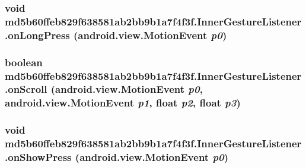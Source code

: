 \hypertarget{classmd5b60ffeb829f638581ab2bb9b1a7f4f3f_1_1_inner_gesture_listener_6ba34beec4f15b2b99e347516a70bf48}{
\subsubsection[{onLongPress}]{\setlength{\rightskip}{0pt plus 5cm}void md5b60ffeb829f638581ab2bb9b1a7f4f3f.InnerGestureListener.onLongPress (android.view.MotionEvent {\em p0})}}
\label{classmd5b60ffeb829f638581ab2bb9b1a7f4f3f_1_1_inner_gesture_listener_6ba34beec4f15b2b99e347516a70bf48}


\hypertarget{classmd5b60ffeb829f638581ab2bb9b1a7f4f3f_1_1_inner_gesture_listener_cc5b84dc58658cb693ceb013d18483d0}{
\subsubsection[{onScroll}]{\setlength{\rightskip}{0pt plus 5cm}boolean md5b60ffeb829f638581ab2bb9b1a7f4f3f.InnerGestureListener.onScroll (android.view.MotionEvent {\em p0}, \/  android.view.MotionEvent {\em p1}, \/  float {\em p2}, \/  float {\em p3})}}
\label{classmd5b60ffeb829f638581ab2bb9b1a7f4f3f_1_1_inner_gesture_listener_cc5b84dc58658cb693ceb013d18483d0}


\hypertarget{classmd5b60ffeb829f638581ab2bb9b1a7f4f3f_1_1_inner_gesture_listener_4a73104a37519a590fd0d475acd83095}{
\subsubsection[{onShowPress}]{\setlength{\rightskip}{0pt plus 5cm}void md5b60ffeb829f638581ab2bb9b1a7f4f3f.InnerGestureListener.onShowPress (android.view.MotionEvent {\em p0})}}
\label{classmd5b60ffeb829f638581ab2bb9b1a7f4f3f_1_1_inner_gesture_listener_4a73104a37519a590fd0d475acd83095}



